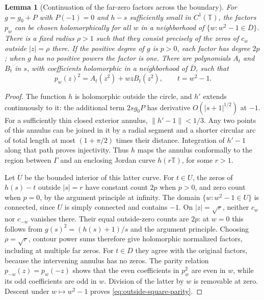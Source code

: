 \documentclass[11pt]{article}
\newtheorem{lemma}[proposition]{Lemma}
\newcommand{\T}{\mathbb T}
\begin{document}
\begin{lemma}[Continuation of the far-zero factors across the boundary]
\label{lem:far-factor-collar}
For $g=g_0+P$ with $P(-1)=0$ and $h-s$ sufficiently small
in $C^1(\T)$, the factors $p_w$ can be chosen
holomorphically for all $w$ in a neighborhood of
$\{w:w^2-1\in\overline D\}$. There is a fixed radius $\rho>1$
such that they consist precisely of the zeros of $c_w$ outside
$|z|=\rho$ there. If the positive degree of $g$ is $p>0$, each factor
has degree $2p$; when $g$ has no positive powers the factor is one.
There are polynomials $A_t$ and $B_t$ in $s$, with coefficients
holomorphic in a neighborhood of $\overline D$, such that
\begin{equation}\label{eq:outside-square-parity}
 p_w(z)^2=A_t(z^2)+wzB_t(z^2),\qquad t=w^2-1.
\end{equation}
\end{lemma}
\begin{proof}
The function $h$ is holomorphic outside the circle, and $h'$ extends
continuously to it: the additional term $2sg_0P$ has derivative
$O(|s+1|^{1/2})$ at $-1$. For a sufficiently thin closed exterior
annulus, $\|h'-1\|<1/3$. Any two points of this annulus can be joined
in it by a radial segment and a shorter circular arc of total length
at most $(1+\pi/2)$ times their distance. Integration of $h'-1$
along that path proves injectivity. Thus $h$ maps the annulus
conformally to the region between $\Gamma$ and an enclosing Jordan
curve $h(r\T)$, for some $r>1$.

Let $U$ be the bounded interior of this latter curve. For $t\in U$,
the zeros of $h(s)-t$ outside $|s|=r$ have constant count $2p$ when
$p>0$, and zero count when $p=0$, by the argument principle at
infinity. The domain $\{w:w^2-1\in U\}$ is connected, since $U$
is simply connected and contains $-1$. On $|z|=\sqrt r$, neither
$c_w$ nor $c_{-w}$ vanishes there. Their equal outside-zero counts
are $2p$: at $w=0$ this follows from
$g(s)^2=(h(s)+1)/s$ and the argument principle. Choosing
$\rho=\sqrt r$, contour power sums therefore give holomorphic
normalized factors, including at multiple far zeros. For $t\in D$
they agree with the original factors, because the intervening
annulus has no zeros. The parity relation $p_{-w}(z)=p_w(-z)$ shows
that the even coefficients in $p_w^2$ are even in $w$, while its
odd coefficients are odd in $w$. Division of the latter by $w$ is
removable at zero. Descent under $w\mapsto w^2-1$ proves
\eqref{eq:outside-square-parity}.
\end{proof}
\end{document}
